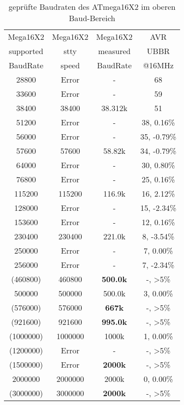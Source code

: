 \begin{table}[H]
  \begin{center}
    \begin{tabular}{| c | c | c || c |}
    \hline
    Mega16X2  & Mega16X2 & Mega16X2   & AVR \\
    supported  & stty  & measured  & UBBR  \\
    BaudRate   & speed & BaudRate  & @16MHz \\
    \hline
    \hline
    \hline
      28800  &  Error   &   -       &    68 \\
    \hline
      33600  &  Error   &   -       &    59  \\
    \hline
      38400  &  38400   &  38.312k  &    51  \\
    \hline
      51200  &  Error   &   -       &    38,  0.16\%  \\
    \hline
      56000  &  Error   &   -       &    35, -0.79\%  \\
    \hline
      57600  &  57600   &  58.82k    &    34, -0.79\%  \\
    \hline
      64000  &  Error   &   -       &    30,  0.80\%  \\
    \hline
      76800  &  Error   &   -       &    25, 0.16\%  \\
    \hline
     115200  &  115200  &  116.9k   &    16, 2.12\%  \\
    \hline
     128000  &  Error   &   -       &    15, -2.34\%  \\
    \hline
     153600  &  Error   &   -       &    12, 0.16\%  \\
    \hline
     230400  &  230400  &  221.0k   &    8, -3.54\%  \\
    \hline
     250000  &  Error   &   -       &    7, 0.00\%  \\
    \hline
     256000  &  Error   &   -       &    7, -2.34\%  \\
    \hline
    (460800) &  460800  & \bf{500.0k} &    -, >5\%  \\
    \hline
     500000  &  500000  &  500.0k   &    3, 0.00\%  \\
    \hline
    (576000)  & 576000 & \bf{667k}  &    -, >5\%  \\
    \hline
    (921600) &  921600  & \bf{995.0k} &    -, >5\%  \\
    \hline
   (1000000) & 1000000 &   1000k    &    1, 0.00\%  \\
    \hline
   (1200000) &  Error   &   -        &   -, >5\%  \\
    \hline
   (1500000) & Error  & \bf{2000k} &   -, >5\%  \\
    \hline
    2000000  & 2000000 &   2000k   & 0, 0.00\%  \\
    \hline
   (3000000) & 3000000 & \bf{2000k} &   -, >5\%   \\
    \hline
    \end{tabular}
  \end{center}
  \caption{geprüfte Baudraten des ATmega16X2 im oberen Baud-Bereich}
  \label{tab:mega16xbaudh}
\end{table}

